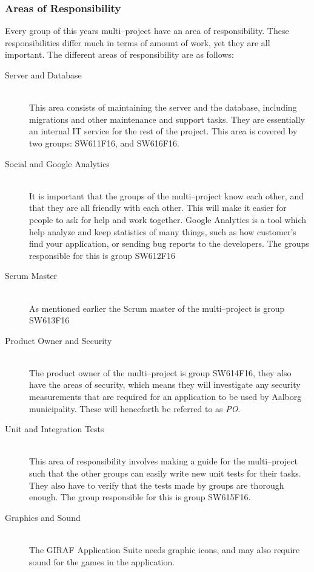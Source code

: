 \subsubsection*{Areas of Responsibility}
Every group of this years multi--project have an area of responsibility.
These responsibilities differ much in terms of amount of work, yet they are all important.
The different areas of responsibility are as follows:

\begin{description}
	\item[Server and Database] \hfill \\
	This area consists of maintaining the server and the database, including migrations and other maintenance and support tasks. They are essentially an internal IT service for the rest of the project. This area is covered by two groups: SW611F16, and SW616F16.
	\item[Social and Google Analytics] \hfill \\
	It is important that the groups of the multi--project know each other, and that they are all friendly with each other.
	This will make it easier for people to ask for help and work together.
	Google Analytics is a tool which help analyze and keep statistics of many things, such as how customer's find your application, or sending bug reports to the developers.
	The groups responsible for this is group SW612F16
	\item[Scrum Master] \hfill \\
	As mentioned earlier the Scrum master of the multi--project is group SW613F16
	\item[Product Owner and Security] \hfill \\
	The product owner of the multi--project is group SW614F16, they also have the areas of security, which means they will investigate any security measurements that are required for an application to be used by Aalborg municipality.
    These will henceforth be referred to as \textit{PO}.
	\item[Unit and Integration Tests] \hfill \\
	This area of responsibility involves making a guide for the multi--project such that the other groups can easily write new unit tests for their tasks.
	They also have to verify that the tests made by groups are thorough enough.
	The group responsible for this is group SW615F16.
	\item[Graphics and Sound] \hfill \\
	The GIRAF Application Suite needs graphic icons, and may also require sound for the games in the application.

\end{description}
